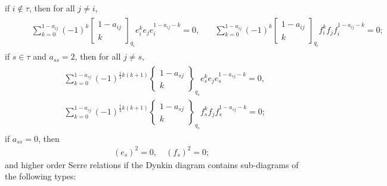 \documentclass[12pt]{amsart}
\theoremstyle{definition}
\theoremstyle{remark}
\numberwithin{equation}{section}
\begin{document}
 \noindent if $i\notin \tau$, then for all $j\ne i$,
\begin{eqnarray}
&&\label{eq:UqB-even}
\begin{aligned}
&\sum_{k=0}^{1-a_{i j}}
(-1)^k \begin{bmatrix} 1-a_{i j}\\k\end{bmatrix}_{q_i} e_i^{k} e_j
e_i^{1-a_{i j}-k}=0,\quad 
&\sum_{k=0}^{1-a_{i j}}
(-1)^k \begin{bmatrix} 1-a_{i j}\\k\end{bmatrix}_{q_i} f_i^{k} f_j
f_i^{1-a_{i j}-k}=0;
\end{aligned}
\end{eqnarray}
if $s\in\tau$ and $a_{s s}=2$, then for all $j\ne s$,
\begin{eqnarray}
&&\label{eq:UqB-odd2}
\begin{aligned}
&\sum_{k=0}^{1-a_{s j}}
(-1)^{\frac{1}{2}k(k+1)} \left\{\begin{array}{c}1-a_{s j}\\k\end{array}\right\}_{q_s} e_s^{k} e_j
e_s^{1-a_{s j}-k}=0, \\
&\sum_{k=0}^{1-a_{s j}}
(-1)^{\frac{1}{2}k(k+1)}
\left\{\begin{array}{c} 1-a_{s j}\\k\end{array}\right\}_{q_s} f_s^{k} f_j
f_s^{1-a_{s j}-k}=0;
\end{aligned}
\end{eqnarray}
if $a_{s s}=0$, then
\begin{eqnarray}
&&\label{eq:UqB-odd0}
(e_s)^2=0, \quad (f_s)^2=0;
\end{eqnarray}
and higher order Serre relations if the Dynkin diagram
contains sub-diagrams of the following types:
\end{document}

